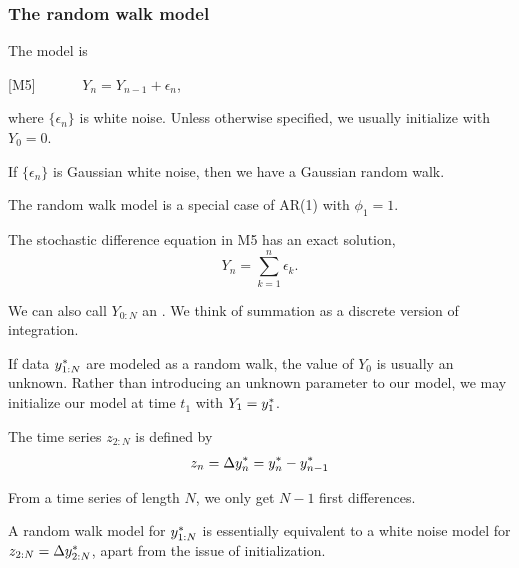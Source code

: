\begin{frame}[fragile]

\frametitle{The random walk model}


\vspace{-3mm}

\bi

\item The  model is

\vspace{2mm}

[M5] $\quad\quad\quad Y_n = Y_{n-1} + \epsilon_n$,

\vspace{2mm}

where $\{\epsilon_n\}$ is white noise. Unless otherwise specified, we usually initialize with $Y_0=0$.

\item If $\{\epsilon_n\}$ is Gaussian white noise, then we have a Gaussian random walk.

\item The random walk model is a special case of AR(1) with $\phi_1=1$. 

\item The stochastic difference equation in M5 has an exact solution,
$$ Y_n = \sum_{k=1}^n\epsilon_k.$$

\item We can also call $Y_{0:N}$ an . We think of summation as a discrete version of integration.

\item If data $y_{1:N}^*$ are modeled as a random walk, the value of $Y_0$ is usually an unknown. Rather than introducing an unknown parameter to our model, we may initialize our model at time $t_1$ with $Y_1=y_1^*$.

\ei

\end{frame}

\begin{frame}[fragile]
\bi
\item The  time series $z_{2:N}$ is defined by
\begin{equation}
z_n= \Delta y_n^* = y_{n}^*-y_{n-1}^*
\end{equation}

\item From a time series of length $N$, we only get $N-1$ first differences. 

\item A random walk model for $y_{1:N}^*$ is essentially equivalent to a white noise model for $z_{2:N}= \Delta y_{2:N}^*$, apart from the issue of initialization.

\ei

\end{frame}

